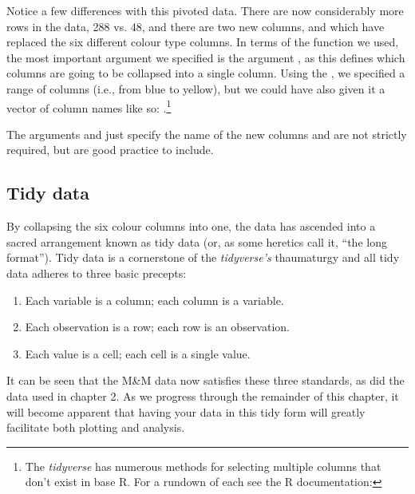 Notice a few differences with this pivoted data. There are now considerably more rows in the data, 288 vs. 48, and there are two new columns,  and  which have replaced the six different colour type columns. In terms of the  function we used, the most important argument we specified is the argument , as this defines which columns are going to be collapsed into a single column. Using the \R{:}, we specified a range of columns (i.e., from blue to yellow), but we could have also given it a vector of column names like so: .\footnote{The \textit{tidyverse} has numerous methods for selecting multiple columns that don't exist in base R.  For a rundown of each see the R documentation: }

The arguments  and  just specify the name of the new columns and are not strictly required, but are good practice to include.


\subsection{Tidy data}

By collapsing the six colour columns into one, the data has ascended into a sacred arrangement known as \gls{tidy data} (or, as some heretics call it, ``the long format'').  Tidy data is a cornerstone of the \textit{tidyverse's} thaumaturgy and all tidy data adheres to three basic precepts:

\begin{minipage}{\textwidth}

\begin{enumerate}[label=\Roman*.]
\selectfont
    \item Each variable is a column; each column is a variable.
    \item Each observation is a row; each row is an observation.
    \item Each value is a cell; each cell is a single value.
\end{enumerate}
\end{minipage}

\noindent
It can be seen that the M\&M data now satisfies these three standards, as did the  data used in chapter 2. As we progress through the remainder of this chapter, it will become apparent that having your data in this tidy form will greatly facilitate both plotting and analysis. 


